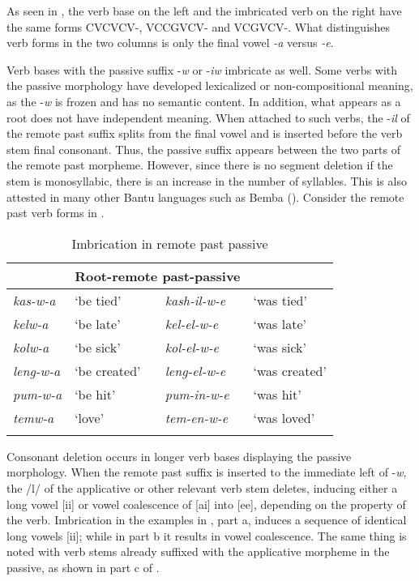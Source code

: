 \documentclass[output=paper]{langsci/langscibook}
\begin{document}
As seen in , the verb base on the left and the imbricated verb on the right have the same forms CVCVCV-, VCCGVCV- and VCGVCV-. What distinguishes verb forms in the two columns is only the final vowel \textit{-a} versus \textit{-e}.

 
Verb bases with the passive suffix -\textit{w} or -\textit{iw }imbricate as well. Some verbs with the passive morphology have developed lexicalized or non-compositional meaning, as the -\textit{w} is frozen and has no semantic content. In addition, what appears as a root does not have independent meaning. When attached to such verbs, the -\textit{il} of the remote past suffix splits from the final vowel and is inserted before the verb stem final consonant. Thus, the passive suffix appears between the two parts of the remote past morpheme. However, since there is no segment deletion if the stem is monosyllabic, there is an increase in the number of syllables. This is also attested in many other Bantu languages such as Bemba (\citealt{chebanne1993,hyman1995,kula2002}). Consider the remote past verb forms in .
 

\begin{table}
\begin{tabularx}{\textwidth}{lXlX}
\lsptoprule
\multicolumn{2}{l}{Root-passive-\textsc{fv}}  & \multicolumn{2}{l}{Root-remote past-passive} \\
\midrule 
\textit{kas-w-a} & `be tied' & \textit{kash-il-w-e} & `was tied' \\
\textit{kelw-a} & `be late' & \textit{kel-el-w-e} & `was late' \\
\textit{kolw-a} & `be sick' & \textit{kol-el-w-e} & `was sick' \\
\textit{leng-w-a} & `be created' & \textit{leng-el-w-e} & `was created' \\
\textit{pum-w-a} & `be hit' & \textit{pum-in-w-e} & `was hit' \\
\textit{temw-a} & `love' & \textit{tem-en-w-e} & `was loved' \\

\lspbottomrule
\end{tabularx}

\caption{Imbrication in remote past passive}
\label{tab:25.kawasha}

\end{table}

Consonant deletion occurs in longer verb bases displaying the passive morphology. When the remote past suffix is inserted to the immediate left of -\textit{w}, the /l/ of the applicative or other relevant verb stem deletes, inducing either a long vowel [ii] or vowel coalescence of [ai] into [ee], depending on the property of the verb. Imbrication in the examples in , part a, induces a sequence of identical long vowels [ii]; while in part b it results in vowel coalescence. The same thing is noted with verb stems already suffixed with the applicative morpheme in the passive, as shown in part c of .
\end{document}

